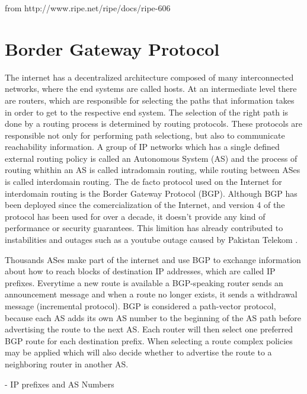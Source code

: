 \documentclass[11pt,a4paper]{scrreprt}
\begin{document}
   
from http://www.ripe.net/ripe/docs/ripe-606

\section{Border Gateway Protocol}

The internet has a decentralized architecture composed of many interconnected networks, where the end systems are called hosts. At an intermediate level there are routers, which are responsible for selecting the paths that information takes in order to get to the respective end system. The selection of the right path is done by a routing process is determined by routing protocols. These protocols are responsible not only for performing path selectiong, but also to communicate reachability information. A group of IP networks which has a single defined external routing policy is called an Autonomous System (AS) and the process of routing whithin an AS is called intradomain routing, while routing between ASes is called interdomain routing. The de facto protocol used on the Internet for interdomain routing is the Border Gateway Protocol (BGP).
Although BGP has been deployed since the comercialization of the Internet, and version 4 of the protocol has been used for over a decade, it doesn't provide any kind of performance or security guarantees. This limition has already contributed to instabilities and outages \cite{Misdirection} such as a youtube outage caused by Pakistan Telekom \cite{Pakistan}. 

	Thousands ASes make part of the internet and use BGP to exchange information about how to reach blocks of destination IP addresses, which are called IP prefixes. Everytime a new route is available a BGP-speaking router sends an announcement message and when a route no longer exists, it sends a withdrawal message (incremental protocol). BGP is considered a path-vector protocol, because each AS adds its own AS number to the beginning of the AS path before advertising the route to the next AS. Each router will then select one preferred BGP route for each destination prefix. When selecting a route complex policies may be applied which will also decide whether to advertise the route to a neighboring router in another AS.   

	- IP prefixes and AS Numbers
	
\end{document}
